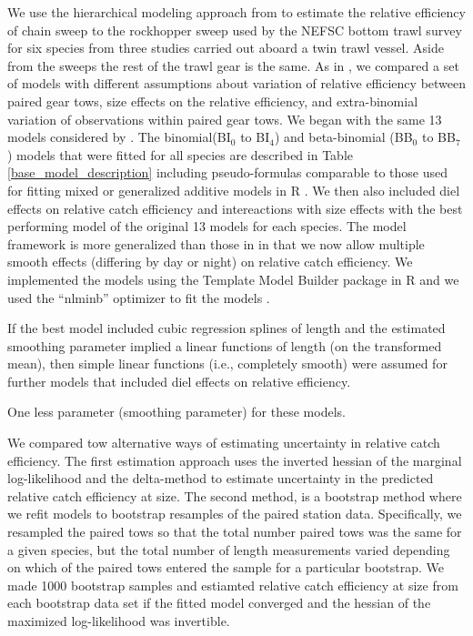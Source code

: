 \documentclass[]{article}
\begin{document}
We use the hierarchical modeling approach from \citet{miller13} to
estimate the relative efficiency of chain sweep to the rockhopper sweep
used by the NEFSC bottom trawl survey for six species from three studies
carried out aboard a twin trawl vessel. Aside from the sweeps the rest
of the trawl gear is the same. As in \citet{miller13}, we compared a set
of models with different assumptions about variation of relative
efficiency between paired gear tows, size effects on the relative
efficiency, and extra-binomial variation of observations within paired
gear tows. We began with the same 13 models considered by
\citet{miller13}. The binomial(BI\(_0\) to BI\(_4\)) and beta-binomial
(BB\(_0\) to BB\(_7\)) models that were fitted for all species are
described in Table \ref{base_model_description} including
pseudo-formulas comparable to those used for fitting mixed or
generalized additive models in R \citep{R19,wood06}. We then also
included diel effects on relative catch efficiency and intereactions
with size effects with the best performing model of the original 13
models for each species. The model framework is more generalized than
those in \citet{miller13} in that we now allow multiple smooth effects
(differing by day or night) on relative catch efficiency. We implemented
the models using the Template Model Builder package
\citep{kristensenetal16} in R and we used the ``nlminb'' optimizer to
fit the models \citep{R19}.

If the best model included cubic regression splines of length and the
estimated smoothing parameter implied a linear functions of length (on
the transformed mean), then simple linear functions (i.e., completely
smooth) were assumed for further models that included diel effects on
relative efficiency.

One less parameter (smoothing parameter) for these models.

We compared tow alternative ways of estimating uncertainty in relative
catch efficiency. The first estimation approach uses the inverted
hessian of the marginal log-likelihood and the delta-method to estimate
uncertainty in the predicted relative catch efficiency at size. The
second method, is a bootstrap method where we refit models to bootstrap
resamples of the paired station data. Specifically, we resampled the
paired tows so that the total number paired tows was the same for a
given species, but the total number of length measurements varied
depending on which of the paired tows entered the sample for a
particular bootstrap. We made 1000 bootstrap samples and estiamted
relative catch efficiency at size from each bootstrap data set if the
fitted model converged and the hessian of the maximized log-likelihood
was invertible.
\end{document}
